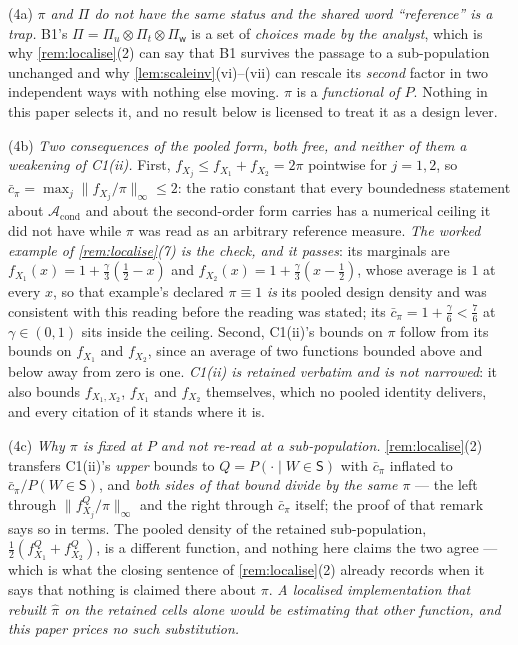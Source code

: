 \begin{remark}
\begin{enumerate}
\textup{(4a)} \emph{$\pi$ and $\Pi$ do not have the same status and the shared word ``reference'' is a
trap.} B1's $\Pi=\Pi_u\otimes\Pi_t\otimes\Pi_{\mathsf w}$ is a set of \emph{choices made by the
analyst}, which is why \cref{rem:localise}\textup{(2)} can say that B1 survives the passage to a
sub-population unchanged and why \cref{lem:scaleinv}\textup{(vi)}--\textup{(vii)} can rescale its
\emph{second} factor in two independent ways with nothing else moving. $\pi$ is a \emph{functional of
$P$}. Nothing in this paper selects it, and no result below is licensed to treat it as a design lever.

\textup{(4b)} \emph{Two consequences of the pooled form, both free, and neither of them a weakening of
C1(ii).} First, $f_{X_j}\le f_{X_1}+f_{X_2}=2\pi$ pointwise for $j=1,2$, so
$\bar c_\pi=\max_j\|f_{X_j}/\pi\|_\infty\le2$: the ratio constant that every boundedness statement about
$\mathcal A_{\mathrm{cond}}$ and about the second-order form carries has a numerical ceiling it did not
have while $\pi$ was read as an arbitrary reference measure. \emph{The worked example of
\cref{rem:localise}\textup{(7)} is the check, and it passes}: its marginals are
$f_{X_1}(x)=1+\tfrac{\gamma}{3}(\tfrac12-x)$ and $f_{X_2}(x)=1+\tfrac{\gamma}{3}(x-\tfrac12)$, whose
average is $1$ at every $x$, so that example's declared $\pi\equiv1$ \emph{is} its pooled design
density and was consistent with this reading before the reading was stated; its
$\bar c_\pi=1+\tfrac{\gamma}{6}<\tfrac76$ at $\gamma\in(0,1)$ sits inside the ceiling.
Second, C1(ii)'s bounds on $\pi$ follow from its bounds on $f_{X_1}$ and $f_{X_2}$,
since an average of two functions bounded above and below away from zero is one. \emph{C1(ii) is
retained verbatim and is not narrowed}: it also bounds $f_{X_1,X_2}$, $f_{X_1}$ and $f_{X_2}$
themselves, which no pooled identity delivers, and every citation of it stands where it is.

\textup{(4c)} \emph{Why $\pi$ is fixed at $P$ and not re-read at a sub-population.}
\cref{rem:localise}\textup{(2)} transfers C1(ii)'s \emph{upper} bounds to $Q=P(\cdot\mid W\in\mathsf S)$
with $\bar c_\pi$ inflated to $\bar c_\pi/P(W\in\mathsf S)$, and \emph{both sides of that bound divide by
the same $\pi$} --- the left through $\|f^{Q}_{X_j}/\pi\|_\infty$ and the right through $\bar c_\pi$
itself; the proof of that remark says so in terms. The pooled density of the
retained sub-population, $\tfrac12(f^{Q}_{X_1}+f^{Q}_{X_2})$, is a different function, and nothing here
claims the two agree --- which is what the closing sentence of \cref{rem:localise}\textup{(2)} already
records when it says that nothing is claimed there about $\pi$. \emph{A localised implementation that
rebuilt $\hat\pi$ on the retained cells alone would be estimating that other function, and this paper
prices no such substitution.}


\end{enumerate}
\end{remark}
